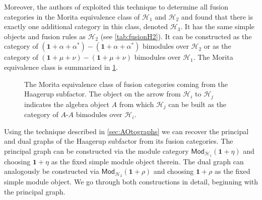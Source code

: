 {{{			Moreover, the authors of \cite{grossman_quantum_2012} exploited this technique to determine all fusion categories in the Morita equivalence class of $\mathcal{H}_1$ and $\mathcal{H}_2$ and found that there is exactly one additional category in this class, denoted $\mathcal{H}_3$. It has the same simple objects and fusion rules as $\mathcal{H}_2$ (see \cref{tab:fusionH2}). It can be constructed as the category of $(\mathbf{1}+\alpha+\alpha^*)-(\mathbf{1}+\alpha+\alpha^*)$ bimodules over $\mathcal{H}_2$ or as the category of $(\mathbf{1}+\mu+\nu)-(\mathbf{1}+\mu+\nu)$ bimodules over $\mathcal{H}_1$. The Morita equivalence class is summarized in \cref{fig:MoritaH}.
			\begin{figure}[H]
				\centering
				\caption{\small \label{fig:MoritaH}The Morita equivalence class of fusion categories coming from the Haagerup subfactor. The object on the arrow from $\mathcal{H}_i$ to $\mathcal{H}_j$ indicates the algebra object $A$ from which $\mathcal{H}_j$ can be built as the category of $A$-$A$ bimodules over $\mathcal{H}_i$.}
			\end{figure}
			
	\begin{exmp}
		Using the technique described in \cref{sec:AOtographs} we can recover the principal and dual graphs of the Haagerup subfactor from its fusion categories. The principal graph can be constructed via the module category $\mathsf{Mod}_{\mathcal{H}_1}(\mathbf{1}+\eta)$ and choosing $\mathbf{1}+\eta$ as the fixed simple module object therein. The dual graph can analogously be constructed via $\mathsf{Mod}_{\mathcal{H}_2}(\mathbf{1}+\rho)$ and choosing $\mathbf{1}+\rho$ as the fixed simple module object. We go through both constructions in detail, beginning with the principal graph. 
			

\end{exmp}}}}
